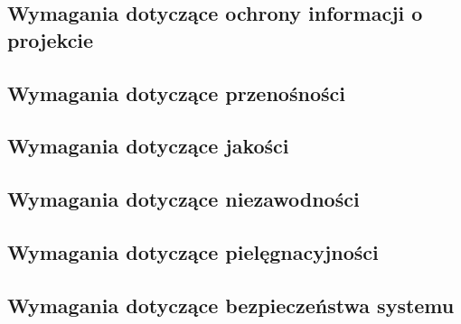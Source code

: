 \documentclass[12pt,a4paper]{report}
\begin{document}
\subsection{Wymagania dotyczące ochrony informacji o projekcie}
\subsection{Wymagania dotyczące przenośności}
\subsection{Wymagania dotyczące jakości}
\subsection{Wymagania dotyczące niezawodności}
\subsection{Wymagania dotyczące pielęgnacyjności}
\subsection{Wymagania dotyczące bezpieczeństwa systemu}
\end{document}
